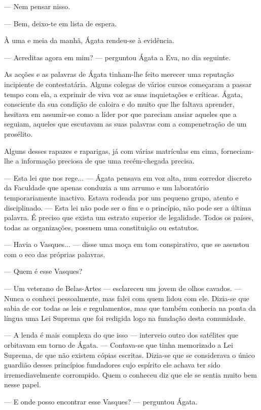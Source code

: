 --- Nem pensar nisso.

--- Bem, deixo-te em lista de espera.

À uma e meia da manhã, Ágata rendeu-se à evidência.

--- Acreditas agora em mim? --- perguntou Ágata a Eva, no dia seguinte.

As acções e as palavras de Ágata tinham-lhe feito merecer uma reputação
incipiente de contestatária. Alguns colegas de vários cursos começaram a
passar tempo com ela, a exprimir de viva voz as suas inquietações e
críticas. Ágata, consciente da sua condição de caloira e do muito que
lhe faltava aprender, hesitava em assumir-se como a líder por que pareciam ansiar aqueles que
a seguiam, aqueles que escutavam as suas palavras com a compenetração de
um prosélito.

Alguns desses rapazes e raparigas, já com várias matrículas em cima,
forneciam-lhe a informação preciosa de que uma recém-chegada precisa.

--- Esta lei que nos rege... --- Ágata pensava em voz alta, num corredor
discreto da Faculdade que apenas conduzia a um arrumo e um laboratório
temporariamente inactivo. Estava rodeada por um pequeno grupo, atento e
disciplinado. --- Esta lei não pode ser o fim e o princípio, não pode ser a última
palavra. É preciso que exista um estrato superior de legalidade. Todos
os países, todas as organizações, possuem uma constituição ou
estatutos.

--- Havia o Vasques... --- disse uma moça em tom conspirativo, que se
assustou com o eco das próprias palavras.

--- Quem é esse Vasques?

--- Um veterano de Belas-Artes --- esclareceu um jovem de olhos cavados.
--- Nunca o conheci pessoalmente, mas falei com quem lidou com ele.
Dizia-se que sabia de cor todas as leis e regulamentos, mas que
também conhecia na ponta da língua uma Lei Suprema que foi redigida
logo na fundação desta comunidade.

--- A lenda é mais complexa do que isso --- interveio outro dos
satélites que orbitavam em torno de Ágata. --- Contava-se que tinha
memorizado a Lei Suprema, de que não existem cópias escritas.
Dizia-se que se considerava o único guardião desses princípios
fundadores cujo espírito ele achava ter sido irremediavelmente
corrompido. Quem o conheceu diz que ele se sentia muito bem nesse
papel.

--- E onde posso encontrar esse Vasques? --- perguntou Ágata.

